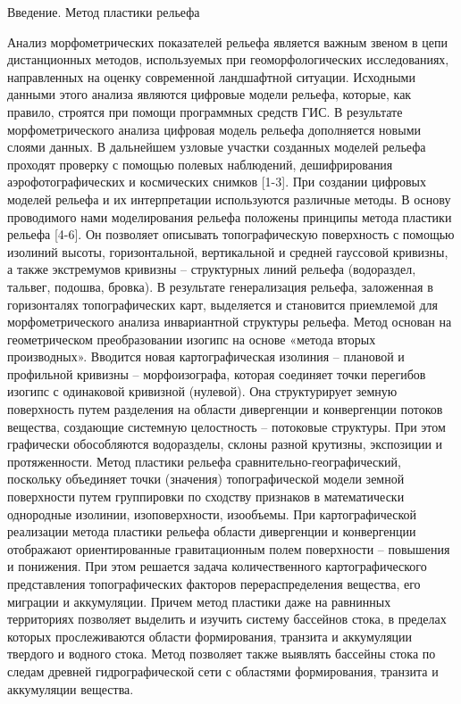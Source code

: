 \documentclass[runningheads]{AIIT}
\begin{document}
Введение. Метод пластики рельефа

Анализ морфометрических показателей рельефа является важным звеном в цепи дистанционных методов, используемых при геоморфологических исследованиях, направленных на оценку современной ландшафтной ситуации. Исходными данными этого анализа являются цифровые модели рельефа, которые, как правило, строятся при помощи программных средств ГИС. В результате морфометрического анализа цифровая модель рельефа дополняется новыми слоями данных. В дальнейшем узловые участки созданных моделей рельефа проходят проверку с помощью полевых наблюдений, дешифрирования аэрофотографических и космических снимков [1-3].
При создании цифровых моделей рельефа и их интерпретации используются различные методы. В основу проводимого нами моделирования рельефа положены принципы метода пластики рельефа [4-6]. Он позволяет описывать топографическую поверхность с помощью изолиний высоты, горизонтальной, вертикальной и средней гауссовой кривизны, а также экстремумов кривизны – структурных линий рельефа (водораздел, тальвег, подошва, бровка). В результате генерализация рельефа, заложенная в горизонталях топографических карт, выделяется и становится приемлемой для морфометрического анализа инвариантной структуры рельефа. Метод основан на геометрическом преобразовании изогипс на основе «метода вторых производных». Вводится новая картографическая изолиния – плановой и профильной кривизны – морфоизографа, которая соединяет точки перегибов изогипс с одинаковой кривизной (нулевой). Она структурирует земную поверхность путем разделения на области дивергенции и конвергенции потоков вещества, создающие системную целостность – потоковые структуры. При этом графически обособляются водоразделы, склоны разной крутизны, экспозиции и протяженности. Метод пластики рельефа сравнительно-географический, поскольку объединяет точки (значения) топографической модели земной поверхности путем группировки по сходству признаков в математически однородные изолинии, изоповерхности, изообъемы.
При картографической реализации метода пластики рельефа области дивергенции и конвергенции отображают ориентированные гравитационным полем поверхности – повышения и понижения. При этом решается задача количественного картографического представления топографических факторов перераспределения вещества, его миграции и аккумуляции. Причем метод пластики даже на равнинных территориях позволяет выделить и изучить систему бассейнов стока, в пределах которых прослеживаются области формирования, транзита и аккумуляции твердого и водного стока. Метод позволяет также выявлять бассейны стока по следам древней гидрографической сети с областями формирования, транзита и аккумуляции вещества.
\end{document}
